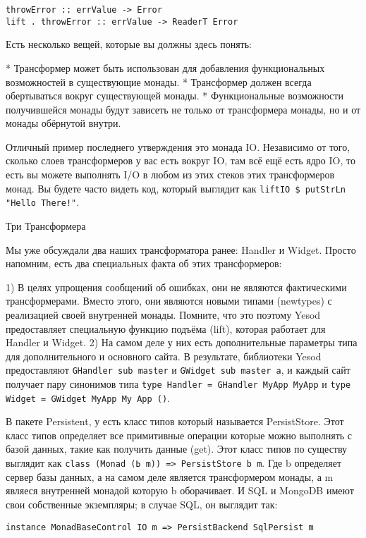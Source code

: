 \begin{lstlisting}
throwError :: errValue -> Error
lift . throwError :: errValue -> ReaderT Error
\end{lstlisting}

Есть несколько вещей, которые вы должны здесь понять:

* Трансформер может быть использован для добавления функциональных возможностей в существующие монады.
* Трансформер должен всегда обертываться вокруг существующей монады.
* Функциональные возможности получившейся монады будут зависеть не только от трансформера монады, но и от монады обёрнутой внутри.

Отличный пример последнего утверждения это монада IO. Независимо от того, сколько слоев трансформеров у вас есть вокруг IO, там всё ещё есть ядро IO, то есть вы можете выполнять I/O в любом из этих стеков этих трансформеров монад. Вы будете часто видеть код, который выглядит как \lstinline'liftIO $ putStrLn "Hello There!"'.

Три Трансформера

Мы уже обсуждали два наших трансформатора ранее: Handler и Widget. Просто напомним, есть два специальных факта об этих трансформеров:

1) В целях упрощения сообщений об ошибках, они не являются фактическими трансформерами. Вместо этого, они являются новыми типами (newtypes) с реализацией своей внутренней монады. Помните, что это поэтому Yesod предоставляет специальную функцию подъёма (lift), которая работает для Handler и Widget.
2) На самом деле у них есть дополнительные параметры типа для дополнительного и основного сайта. В результате, библиотеки Yesod предоставляют \lstinline'GHandler sub master' и \lstinline'GWidget sub master a', и каждый сайт получает пару синонимов типа \lstinline'type Handler = GHandler MyApp MyApp' и \lstinline'type Widget = GWidget MyApp My App ()'.

В пакете Persistent, у есть класс типов который называется PersistStore. Этот класс типов определяет все примитивные операции которые можно выполнять с базой данных, такие как  получить данные (get). Этот класс типов по существу выглядит как \lstinline'class (Monad (Ь m)) => PersistStore b m'. Где b определяет сервер базы данных, а на самом деле является трансформером монады, а m являеся внутренней монадой которую b оборачивает. И SQL и MongoDB имеют свои собственные экземпляры; в случае SQL, он выглядит так:

\begin{lstlisting}
instance MonadBaseControl IO m => PersistBackend SqlPersist m
\end{lstlisting}

